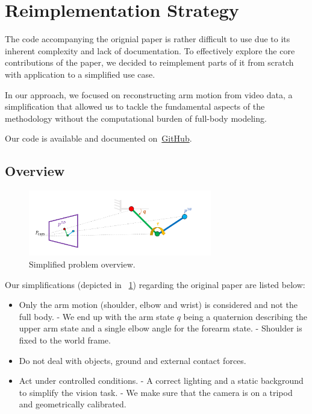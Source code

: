 \section{Reimplementation Strategy}
\label{sec:remplementation}

The code accompanying the orignial paper is rather difficult to use due to its inherent complexity and lack of documentation. 
To effectively explore the core contributions of the paper, 
we decided to reimplement parts of it from scratch with application to a simplified use case.

In our approach, we focused on reconstructing arm motion from video data,
a simplification that allowed us to tackle the fundamental 
aspects of the methodology without the computational burden of full-body modeling.

Our code is available and documented on~\href{https://github.com/balthazarneveu/monocular_pose_and_forces_estimation}{GitHub}.

\subsection{Overview}
\label{subsec:overview}


\begin{figure}
    \centering
    \includegraphics[width=8cm]{figures/simplification_overview.png}
    \caption{
    Simplified problem overview.
    }
    \label{fig:simplified_setup}
\end{figure}

Our simplifications (depicted in ~\cref{fig:simplified_setup}) regarding the original paper are listed below:
\begin{itemize}
    \item Only the arm motion (shoulder, elbow and wrist) is considered and not the full body.
    \subitem - We end up with the arm state $q$ being a quaternion describing 
    the upper arm state and a single elbow angle for the forearm state.
    \subitem - Shoulder is fixed to the world frame.
    \item Do not deal with objects, ground and external contact forces.
    \item Act under controlled conditions.
    \subitem - A correct lighting and a static background to simplify the vision task.
    \subitem - We make sure that the camera is on a tripod and geometrically calibrated.
\end{itemize}


